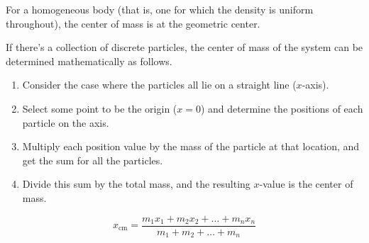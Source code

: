 \documentclass{article}
\begin{document}
For a homogeneous body (that is, one for which the density is uniform throughout), the center of mass is at the geometric center.

If there's a collection of discrete particles, the center of mass of the system can be determined mathematically as follows.
\begin{enumerate}
    \item Consider the case where the particles all lie on a straight line ($x$-axis).
    \item Select some point to be the origin ($x = 0$) and determine the positions of each particle on the axis.
    \item Multiply each position value by the mass of the particle at that location, and get the sum for all the particles.
    \item Divide this sum by the total mass, and the resulting $x$-value is the center of mass.
\end{enumerate} 
\begin{equation*}
    x_{\text{cm}} = \frac{m_{1}x_{1}+m_{2}x_{2}+\dots+m_{n}x_{n}}{m_{1}+m_{2}+\dots+m_{n}}
\end{equation*}
\end{document}
